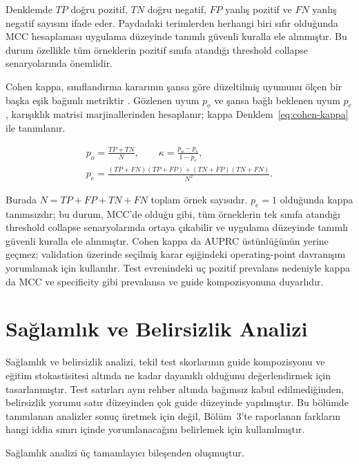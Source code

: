 Denklemde \(TP\) doğru pozitif, \(TN\) doğru negatif, \(FP\) yanlış pozitif ve \(FN\) yanlış negatif sayısını ifade eder. Paydadaki terimlerden herhangi biri sıfır olduğunda MCC hesaplaması uygulama düzeyinde tanımlı güvenli kuralla ele alınmıştır. Bu durum özellikle tüm örneklerin pozitif sınıfa atandığı threshold collapse senaryolarında önemlidir.

Cohen kappa, sınıflandırma kararının şansa göre düzeltilmiş uyumunu ölçen bir başka eşik bağımlı metriktir . Gözlenen uyum \(p_o\) ve şansa bağlı beklenen uyum \(p_e\), karışıklık matrisi marjinallerinden hesaplanır; kappa Denklem~\ref{eq:cohen-kappa} ile tanımlanır.

\begin{equation}
\begin{gathered}
p_o = \frac{TP+TN}{N}, \qquad \kappa = \frac{p_o - p_e}{1 - p_e}, \\[4pt]
p_e = \frac{(TP+FN)(TP+FP) + (TN+FP)(TN+FN)}{N^2}.
\end{gathered}
\label{eq:cohen-kappa}
\end{equation}

Burada \(N = TP+FP+TN+FN\) toplam örnek sayısıdır. \(p_e = 1\) olduğunda kappa tanımsızdır; bu durum, MCC'de olduğu gibi, tüm örneklerin tek sınıfa atandığı threshold collapse senaryolarında ortaya çıkabilir ve uygulama düzeyinde tanımlı güvenli kuralla ele alınmıştır. Cohen kappa da AUPRC üstünlüğünün yerine geçmez; validation üzerinde seçilmiş karar eşiğindeki operating-point davranışını yorumlamak için kullanılır. Test evrenindeki uç pozitif prevalans nedeniyle kappa da MCC ve specificity gibi prevalansa ve guide kompozisyonuna duyarlıdır.

\section{Sağlamlık ve Belirsizlik Analizi}

Sağlamlık ve belirsizlik analizi, tekil test skorlarının guide kompozisyonu ve eğitim stokastisitesi altında ne kadar dayanıklı olduğunu değerlendirmek için tasarlanmıştır. Test satırları aynı rehber altında bağımsız kabul edilmediğinden, belirsizlik yorumu satır düzeyinden çok guide düzeyinde yapılmıştır. Bu bölümde tanımlanan analizler sonuç üretmek için değil, Bölüm~3'te raporlanan farkların hangi iddia sınırı içinde yorumlanacağını belirlemek için kullanılmıştır.

Sağlamlık analizi üç tamamlayıcı bileşenden oluşmuştur.

